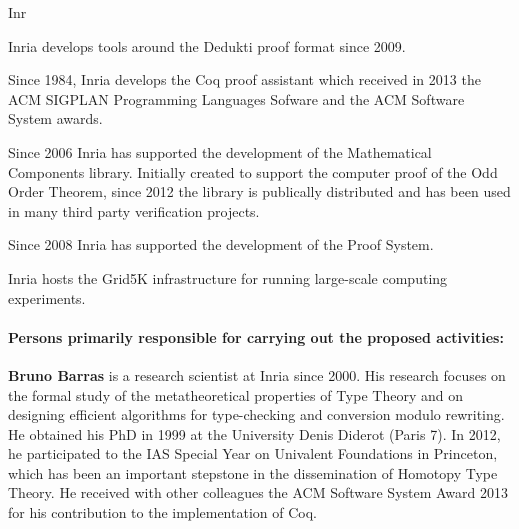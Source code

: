 \begin{sitedescription}{Inr}

\begin{compactitem}
\item Inria develops tools around the Dedukti proof format since 2009.
\item Since 1984, Inria develops the Coq proof assistant which
  received in 2013 the ACM SIGPLAN Programming Languages Sofware and
  the ACM Software System awards.
\item Since 2006 Inria has supported the development of the Mathematical Components
  library. Initially created to support the computer proof of
  the Odd Order Theorem, since 2012 the library is publically distributed
  and has been used in many third party verification projects.
\item Since 2008 Inria has supported the development of the \tlaplus Proof System.
\item Inria hosts the Grid5K infrastructure for running large-scale computing experiments.
\end{compactitem}

\paragraph*{Persons primarily responsible for carrying out the proposed activities:}

\begin{compactitem} %

\item{\bf Bruno Barras} is a research scientist at Inria since
  2000. His research focuses on the formal study of the
  metatheoretical properties of Type Theory and on designing efficient
  algorithms for type-checking and conversion modulo rewriting. He
  obtained his PhD in 1999 at the University Denis Diderot (Paris
  7). In 2012, he participated to the IAS Special Year on Univalent
  Foundations in Princeton, which has been an important stepstone in
  the dissemination of Homotopy Type Theory. He received with other
  colleagues the ACM Software System Award 2013 for his contribution
  to the implementation of Coq.


\end{compactitem}
\end{sitedescription}
